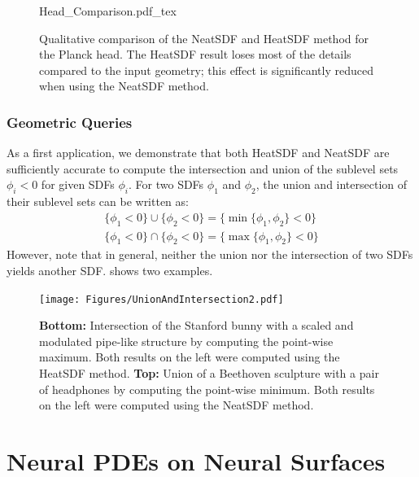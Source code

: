 \documentclass[12pt,openany]{book}
\theoremstyle{plainnormal}
\theoremstyle{remark}
\begin{document}
\begin{figure}
    \centering
    \begingroup
    \sffamily
    \def\svgwidth{0.95\textwidth} %
    {Head_Comparison.pdf_tex}
    \endgroup
    \caption{Qualitative comparison of the NeatSDF and HeatSDF method for the Planck head. The HeatSDF result loses most of the details compared to the input geometry; this effect is significantly reduced when using the NeatSDF method.}
    \label{Head_comp}
\end{figure}
\FloatBarrier

\subsection{Geometric Queries}

As a first application, we demonstrate that both HeatSDF and NeatSDF are sufficiently accurate to compute the intersection and union of the sublevel sets ${\phi_i < 0}$ for given SDFs $\phi_i$. For two SDFs $\phi_1$ and $\phi_2$, the union and intersection of their sublevel sets can be written as:
\begin{align*}
    \{\phi_1 < 0\} \cup \{\phi_2 < 0\} = \{\min\{\phi_1, \phi_2\} < 0\} \\
    \{\phi_1 < 0\} \cap \{\phi_2 < 0\} = \{\max\{\phi_1, \phi_2\} < 0\}
\end{align*}
However, note that in general, neither the union nor the intersection of two SDFs yields another SDF.  shows two examples.
\begin{figure}
    \centering
    \texttt{[image: Figures/UnionAndIntersection2.pdf]}
    \caption{\textbf{Bottom:} Intersection of the Stanford bunny with a scaled and modulated pipe-like structure by computing the point-wise maximum. Both results on the left were computed using the HeatSDF method. \textbf{Top:} Union of a Beethoven sculpture with a pair of headphones by computing the point-wise minimum. Both results on the left were computed using the NeatSDF method.}\label{intersAndunion}
\end{figure}
\chapter{Neural PDEs on Neural Surfaces}\label{NPDEsonSurfaces} 
\end{document}
